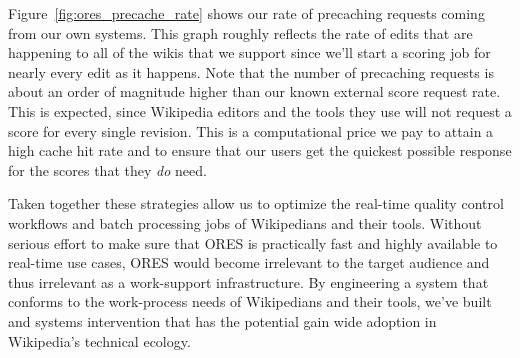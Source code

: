 Figure~\ref{fig:ores_precache_rate} shows our rate of precaching requests coming from our own systems.  This graph roughly reflects the rate of edits that are happening to all of the wikis that we support since we'll start a scoring job for nearly every edit as it happens.  Note that the number of precaching requests is about an order of magnitude higher than our known external score request rate.  This is expected, since Wikipedia editors and the tools they use will not request a score for every single revision.  This is a computational price we pay to attain a high cache hit rate and to ensure that our users get the quickest possible response for the scores that they \emph{do} need.

Taken together these strategies allow us to optimize the real-time quality control workflows and batch processing jobs of Wikipedians and their tools.  Without serious effort to make sure that ORES is practically fast and highly available to real-time use cases, ORES would become irrelevant to the target audience and thus irrelevant as a work-support infrastructure.  By engineering a system that conforms to the work-process needs of Wikipedians and their tools, we've built and systems intervention that has the potential gain wide adoption in Wikipedia's technical ecology. 
